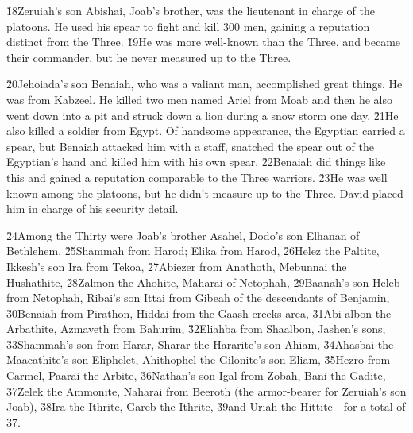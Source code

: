 \v{18}Zeruiah's son Abishai, Joab's brother, was the lieutenant in charge of the platoons. He used his spear to fight and kill 300 men, gaining a reputation distinct from the Three. \v{19}He was more well-known than the Three, and became their commander, but he never measured up to the Three.

\v{20}Jehoiada's son Benaiah, who was a valiant man, accomplished great things. He was from Kabzeel. He killed two men named Ariel from Moab and then he also went down into a pit and struck down a lion during a snow storm one day. \v{21}He also killed a soldier from Egypt. Of handsome appearance, the Egyptian carried a spear, but Benaiah attacked him with a staff, snatched the spear out of the Egyptian's hand and killed him with his own spear. \v{22}Benaiah did things like this and gained a reputation comparable to the Three warriors. \v{23}He was well known among the platoons, but he didn't measure up to the Three. David placed him in charge of his security detail.

\v{24}Among the Thirty were Joab's brother Asahel, Dodo's son Elhanan of Bethlehem, \v{25}Shammah from Harod; Elika from Harod, \v{26}Helez the Paltite, Ikkesh's son Ira from Tekoa, \v{27}Abiezer from Anathoth, Mebunnai the Hushathite, \v{28}Zalmon the Ahohite, Maharai of Netophah, \v{29}Baanah's son Heleb from Netophah, Ribai's son Ittai from Gibeah of the descendants of Benjamin, \v{30}Benaiah from Pirathon, Hiddai from the Gaash creeks area, \v{31}Abi-albon the Arbathite, Azmaveth from Bahurim, \v{32}Eliahba from Shaalbon, Jashen's sons, \v{33}Shammah's son from Harar, Sharar the Hararite's son Ahiam, \v{34}Ahasbai the Maacathite's son Eliphelet, Ahithophel the Gilonite's son Eliam, \v{35}Hezro from Carmel, Paarai the Arbite, \v{36}Nathan's son Igal from Zobah, Bani the Gadite, \v{37}Zelek the Ammonite, Naharai from Beeroth (the armor-bearer for Zeruiah's son Joab), \v{38}Ira the Ithrite, Gareb the Ithrite, \v{39}and Uriah the Hittite---for a total of 37.

